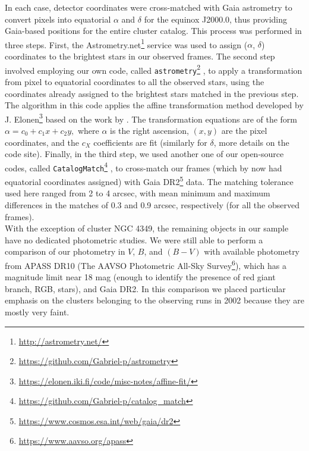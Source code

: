 \documentclass[draft]{aa}
\begin{document}
In each case, detector coordinates were cross-matched with Gaia astrometry to
convert pixels into equatorial $\alpha$ and $\delta$ for the equinox J2000.0,
thus providing Gaia-based positions for the entire cluster catalog.
This process was performed in three steps. First, the
Astrometry.net\footnote{\url{http://astrometry.net/}} service was used to
assign ($\alpha$, $\delta$) coordinates to the brightest stars in our observed
frames. The second step involved employing our own code, called 
\texttt{astrometry}\footnote{\url{https://github.com/Gabriel-p/astrometry}} , to
apply a transformation from pixel to equatorial coordinates to all the observed
stars, using the coordinates already assigned to the brightest stars matched in
the previous step. The algorithm in this code applies the affine transformation
method developed by
J. Elonen\footnote{\url{https://elonen.iki.fi/code/misc-notes/affine-fit/}}
based on the work by \cite{Spath2004}. The transformation equations are of
the form $\alpha=c_0+c_1x+c_2y,$ where $\alpha$ is the right ascension,
$(x, y)$ are the pixel coordinates, and the $c_X$ coefficients are fit
(similarly for $\delta$, more details on the code site).
Finally, in the third step, we used another one of our open-source codes, called
\texttt{CatalogMatch}\footnote{\url{https://github.com/Gabriel-p/catalog_match}}
, to cross-match our frames (which by now had equatorial coordinates assigned)
with Gaia DR2\footnote{\url{https://www.cosmos.esa.int/web/gaia/dr2}} data. The
matching tolerance used here ranged from 2 to 4 arcsec, with mean
minimum and maximum differences in the matches of 0.3 and 0.9 arcsec,
respectively (for all the observed frames).\\


With the exception of cluster NGC 4349, the remaining objects in our
sample have no dedicated photometric studies. We were still able to perform
a comparison of our photometry in $V$, $B$, and $(B-V)$ with available
photometry from APASS DR10 (The AAVSO Photometric All-Sky
Survey\footnote{\url{https://www.aavso.org/apass}}), which has a
magnitude limit near 18 mag (enough to identify the presence of red giant branch, RGB, stars), and
Gaia DR2.
%
In this comparison we placed particular emphasis on the clusters belonging to the
observing runs in 2002 because they are mostly very faint.
\end{document}
